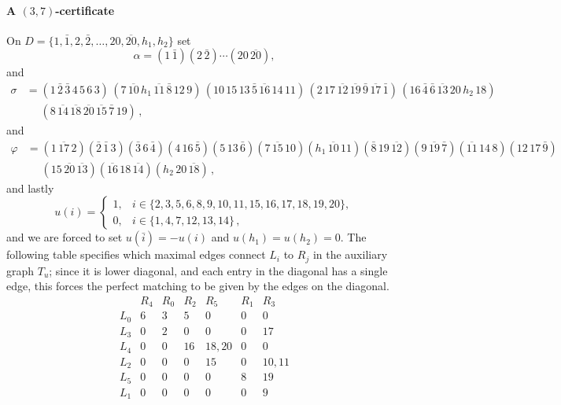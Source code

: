 \documentclass[11pt]{article}
\theoremstyle{remark}
\begin{document}
\paragraph{A $(3,7)$-certificate} On $D=\{1,\bar 1,2,\bar 2,\ldots,20,\overline{20},h_1,h_2\}$ set
\[
\alpha=(1\,\bar1)(2\,\bar2)\cdots(20\,\overline{20}),
\]
and
\begin{equation}
\begin{aligned}
\sigma&=
(1\,\bar2\,\bar3\,4\,5\,6\,3) \,
(7\,\overline{10}\,h_1\,\overline{11}\,\bar8\,12\,9)
\,
(10\,15\,13\,\bar5\,\overline{16}\,14\,11)
\,
(2\,17\,\overline{12}\,\overline{19}\,\bar9\,
 \overline{17}\,\bar1)
\,
(16\,\bar4\,\bar6\,\overline{13}\,20\,h_2\,18)
\\
&\,\, \quad
(8\,\overline{14}\,\overline{18}\,\overline{20}\,
\overline{15}\,\bar7\,19) \, ,
\end{aligned}
\label{eq:C37}
\end{equation}
and
\[
\begin{aligned}
\varphi&=(1\,\overline{17}\,2)
(\bar2\,\bar1\,3)
(\bar3\,6\,\bar4)
(4\,16\,\bar5)
(5\,13\,\bar6)
(7\,\overline{15}\,10)
(h_1\,\overline{10}\,11)
(\bar8\,19\,\overline{12})
(9\,\overline{19}\,\bar7)
(\overline{11}\,14\,8)
(12\,17\,\bar9) 
\\ &\,\,\quad
(15\,\overline{20}\,\overline{13})
(\overline{16}\,18\,\overline{14})
(h_2\,20\,\overline{18}) \, ,
\end{aligned}
\]
and lastly
\[
u(i)=
\begin{cases}
1,
&i\in
\{2,3,5,6,8,9,10,11,15,16,17,18,19,20\},\\
0,
&i\in
\{1,4,7,12,13,14\} \, ,
\end{cases}
\]
and we are forced to set $u(\bar i)=-u(i)$ and $u(h_1)=u(h_2)=0$. The following table specifies which maximal edges connect $L_i$ to $R_j$ in the auxiliary graph $T_u$; since it is lower diagonal, and each entry in the diagonal has a single edge, this forces the perfect matching to be given by the edges on the diagonal.
\[
\begin{array}{c|cccccc}
 & R_4 & R_0 & R_2 & R_5 & R_1 & R_3 \\ \hline
L_0 & 6   & 3   & 5      & 0      & 0  & 0 \\
L_3 & 0   & 2   & 0      & 0      & 0  & 17 \\
L_4 & 0   & 0   & 16     & 18,20      & 0  & 0 \\
L_2 & 0   & 0   & 0  & 15     & 0  & 10,11 \\
L_5 & 0   & 0   & 0      & 0  & 8  & 19 \\
L_1 & 0   & 0  & 0      & 0      & 0 & 9
\end{array}
\]
\end{document}
